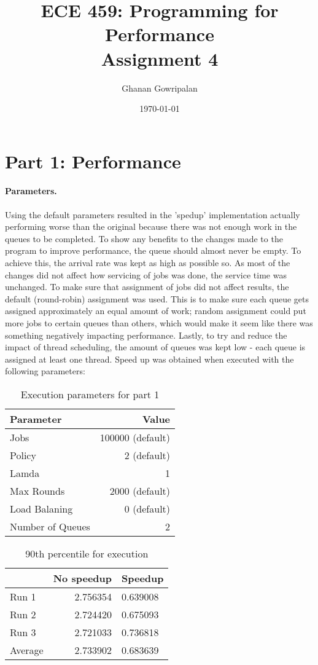 \documentclass[12pt]{article}
\title{ECE 459: Programming for Performance\\Assignment 4}
\author{Ghanan Gowripalan}
\date{\today}
\begin{document}
\maketitle

\section*{Part 1: Performance}

\paragraph{Parameters.} Using the default parameters resulted in the 'spedup' implementation actually performing worse than the original because there was not enough work in the queues to be completed. To show any benefits to the changes made to the program to improve performance, the queue should almost never be empty. To achieve this, the arrival rate was kept as high as possible so. As most of the changes did not affect how servicing of jobs was done, the service time was unchanged. To make sure that assignment of jobs did not affect results, the default (round-robin) assignment was used. This is to make sure each queue gets assigned approximately an equal amount of work; random assignment could put more jobs to certain queues than others, which would make it seem like there was something negatively impacting performance. Lastly, to try and reduce the impact of thread scheduling, the amount of queues was kept low - each queue is assigned at least one thread. Speed up was obtained when executed with the following parameters:

\begin{table}[H]
  \centering
  \begin{tabular}{lr}
    {\bf Parameter} & {\bf Value} \\
    \hline
    Jobs & 100000 (default) \\
    Policy & 2 (default) \\
    Lamda & 1 \\
    Max Rounds & 2000 (default) \\
    Load Balaning & 0 (default) \\
    Number of Queues & 2 \\
  \end{tabular}
  \caption{Execution parameters for part 1}
  \label{tbl-part1-params}
\end{table}

\begin{table}[H]
  \centering
  \begin{tabular}{lr}
    & {\bf No speedup} & {\bf Speedup} \\
    \hline
    Run 1 & 2.756354 & 0.639008 \\
    Run 2 & 2.724420 & 0.675093 \\
    Run 3 & 2.721033 & 0.736818 \\
    \hline
    Average & 2.733902 & 0.683639 \\
  \end{tabular}
  \caption{90th percentile for execution}
  \label{tbl-part1-originall}
\end{table}
\end{document}
